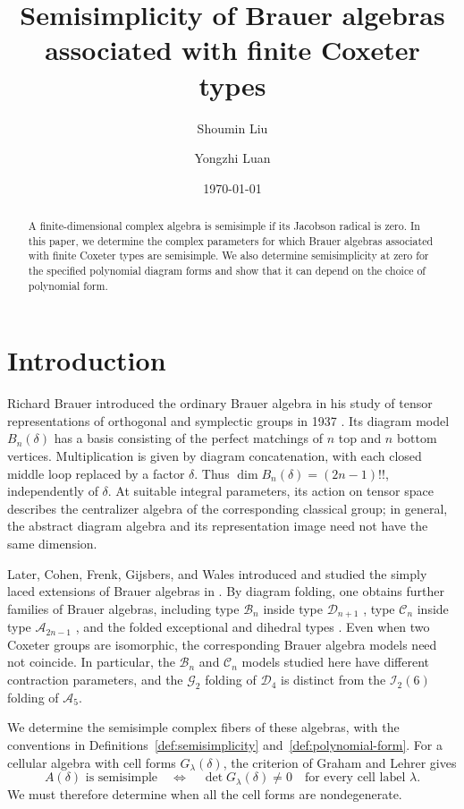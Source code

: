 \documentclass[11pt,a4paper]{amsart}
\title[Semisimplicity Criteria for Brauer Algebras]{Semisimplicity of Brauer algebras associated with finite Coxeter types}
\author[S. Liu]{Shoumin Liu}
\author[Y. Luan]{Yongzhi Luan}
\date{\today}
\theoremstyle{uprightdefinition}
\theoremstyle{remark}\newtheorem{remark}[theorem]{Remark}
\begin{document}
\begin{abstract}
A finite-dimensional complex algebra is semisimple if its Jacobson radical
is zero. In this paper, we determine the complex parameters for which
Brauer algebras associated with finite Coxeter types are semisimple.
We also determine semisimplicity at zero for the specified polynomial
diagram forms and show that it can depend on the choice of polynomial form.
\end{abstract}
\maketitle


\vspace{-\baselineskip}
\tableofcontents


\section*{Introduction}
\label{sec:intro}
Richard Brauer introduced the ordinary Brauer algebra in his study of
tensor representations of orthogonal and symplectic groups in 1937
\cite{Brauer1937}. Its diagram model $B_n(\delta)$ has a basis consisting
of the perfect matchings of $n$ top and $n$ bottom vertices. Multiplication is given
by diagram concatenation, with each closed middle loop replaced by a factor $\delta$.
Thus $\dim B_n(\delta)=(2n-1)!!$, independently of $\delta$. At
suitable integral parameters, its action on tensor space describes
the centralizer algebra of the corresponding classical group; in general, the abstract diagram
algebra and its representation image need not have the same dimension.

Later, Cohen, Frenk, Gijsbers, and Wales introduced and studied the simply laced extensions of Brauer algebras in
\cite{CGW2007,CGWDiagrams2007,CFW2009,CFWerr2019}. By diagram folding, one obtains further
families of Brauer algebras, including type $\mathscr{B}_n$ inside type $\mathscr{D}_{n+1}$
\cite{CohenLiu2014}, type $\mathscr{C}_n$ inside type $\mathscr{A}_{2n-1}$
\cite{CLY2012,Bowman2012}, and the folded exceptional and dihedral types
\cite{LiuF42013,LiuG22015,Liu2016}. Even when two Coxeter groups are isomorphic, the corresponding Brauer algebra models need not coincide. In particular, the $\mathscr{B}_n$ and
$\mathscr{C}_n$ models studied here have different contraction parameters, and the
$\mathscr{G}_2$ folding of $\mathscr{D}_4$ is distinct from the $\mathscr{I}_2(6)$ folding of $\mathscr{A}_5$.

We determine the semisimple complex fibers of these algebras, with the conventions in
Definitions~\ref{def:semisimplicity} and~\ref{def:polynomial-form}.
For a cellular algebra with cell forms $G_\lambda(\delta)$, the criterion of
Graham and Lehrer \cite[Theorem~3.8]{GL1996} gives
\begin{equation}\label{eq:cellular-test}
 A(\delta)\text{ is semisimple}
 \quad\Longleftrightarrow\quad
 \det G_\lambda(\delta)\ne0\quad\text{for every cell label }\lambda.
\end{equation}
We must therefore determine when all the cell forms are nondegenerate.
\end{document}
